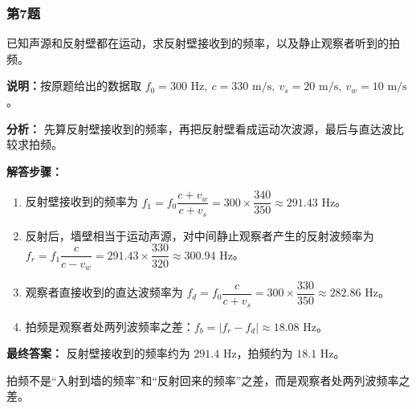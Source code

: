 \documentclass[12pt,a4paper]{ctexart}
\begin{document}
\subsubsection*{第7题}
\begin{tcolorbox}[colback=gray!2!white,colframe=black!60,title={题目}]
已知声源和反射壁都在运动，求反射壁接收到的频率，以及静止观察者听到的拍频。\par
\vspace{0.4em}
\textbf{说明：}按原题给出的数据取 \(f_0=300\text{ Hz},\ c=330\text{ m/s},\ v_s=20\text{ m/s},\ v_w=10\text{ m/s}\)。\par
\end{tcolorbox}
\begin{tcolorbox}[colback=blue!2!white,colframe=blue!55!black,title={完整答案}]
\textbf{分析：}
先算反射壁接收到的频率，再把反射壁看成运动次波源，最后与直达波比较求拍频。\par
\textbf{解答步骤：}
\begin{enumerate}
\item 反射壁接收到的频率为 \(f_1=f_0\dfrac{c+v_w}{c+v_s}=300\times \dfrac{340}{350}\approx 291.43\text{ Hz}\)。
\item 反射后，墙壁相当于运动声源，对中间静止观察者产生的反射波频率为 \(f_r=f_1\dfrac{c}{c-v_w}=291.43\times \dfrac{330}{320}\approx 300.94\text{ Hz}\)。
\item 观察者直接收到的直达波频率为 \(f_d=f_0\dfrac{c}{c+v_s}=300\times \dfrac{330}{350}\approx 282.86\text{ Hz}\)。
\item 拍频是观察者处两列波频率之差：\(f_b=|f_r-f_d|\approx 18.08\text{ Hz}\)。
\end{enumerate}
\textbf{最终答案：}
反射壁接收到的频率约为 \(291.4\text{ Hz}\)，拍频约为 \(18.1\text{ Hz}\)。\par
\end{tcolorbox}
\begin{tcolorbox}[colback=red!2!white,colframe=red!55!black,title={易错点}]
拍频不是“入射到墙的频率”和“反射回来的频率”之差，而是观察者处两列波频率之差。\par
\end{tcolorbox}
\end{document}
